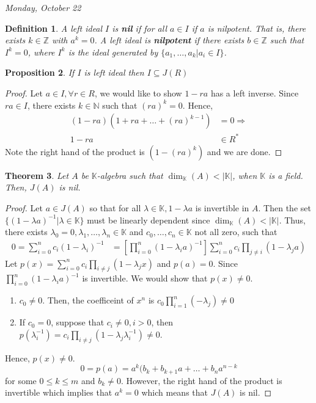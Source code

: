 \documentclass[letterpaper, leqno, 12pt]{article}
\newcommand{\bN}{\mathbb{N}}
\newcommand{\bZ}{\mathbb{Z}}
\newcommand{\bK}{\mathbb{K}}
\theoremstyle{stdthm}
\newtheorem{thm}{Theorem}
\newtheorem{prop}[thm]{Proposition}
\theoremstyle{stddef}
\newtheorem{defn}[thm]{Definition}
\theoremstyle{stdnonum}
\theoremstyle{stdqands}
\theoremstyle{stdbold}
\begin{document}
\begin{center}
\emph{Monday, October 22}
\end{center}

\begin{defn}
A left ideal $I$ is {\bf nil} if for all $a \in I$ if $a$ is nilpotent. That is, there exists $k \in \bZ$ with $a^k = 0$. A left ideal is {\bf nilpotent} if there exists $b \in \bZ$ such that $I^k =0$, where $I^k$ is the ideal generated by $\{a_1,\dots,a_k|a_i \in I\}$. 
\end{defn}

\begin{prop}
If $I$ is left ideal then $I \subseteq J(R)$
\end{prop}

\begin{proof}
Let $a \in I, \forall r \in R$, we would like to show $1 - ra$ has a left inverse. Since $ra \in I$, there exists $k \in \bN$ such that $(ra)^k =0$. Hence, 
\begin{align*}
(1-ra)(1+ ra + \dots + (ra)^{k-1}) &= 0 \Rightarrow\\
1 - ra &\in R^*
\end{align*}
Note the right hand of the product is $(1-(ra)^k)$ and we are done. 
\end{proof}

\begin{thm}
Let $A$ be $\bK$-algebra such that $\dim_{\bK}(A) < |\bK|$, when $\bK$ is a field. Then, $J(A)$ is nil.
\end{thm}

\begin{proof}
Let $a \in J(A)$ so that for all $\lambda \in \bK, 1-\lambda a$ is invertible in $A$. Then the set $\{(1-\lambda a)^{-1}|\lambda \in \bK \}$ must be linearly dependent since $\dim_\bK(A) < |\bK|$. Thus, there exists $\lambda_0 = 0, \lambda_1, \dots, \lambda_n \in \bK$ and $c_0,\dots, c_n \in \bK$ not all zero, such that 
\begin{align*}
0 = \sum_{i=0}^n c_i (1 - \lambda_i)^{-1} &= \left[ \prod_{i=0}^n (1-\lambda_i a)^{-1} \right]\sum_{i=0}^n c_i \prod_{j\neq i} (1-\lambda_j a)
\end{align*}
Let $p(x) = \sum_{i=0}^n c_i \prod_{i\neq j} (1 - \lambda_j x)$ and $p(a) = 0$.  Since $\prod_{i=0}^n (1-\lambda_i a)^{-1}$ is invertible.  We would show that $p(x) \neq 0$. 
\begin{enumerate}
\item $c_0 \neq 0$. Then, the coefficeint of $x^n$ is $c_0 \prod_{i=1}^n (-\lambda_j) \neq 0$
\item If $c_0 = 0$, suppose that $c_i \neq 0, i>0$, then  $p(\lambda_i^{-1}) = c_i \prod_{i\neq j} (1-\lambda_j\lambda_i^{-1}) \neq 0$.  
\end{enumerate}
Hence, $p(x) \neq 0$.  
\[0 = p(a) = a^k (b_k + b_{k+1}a + \dots + b_na^{n-k} \]
for some $0 \leq k \leq m$ and $b_k \neq 0$. However, the right hand of the product is invertible which implies that $a^k =0$ which means that $J(A)$ is nil.
\end{proof}
\end{document}
